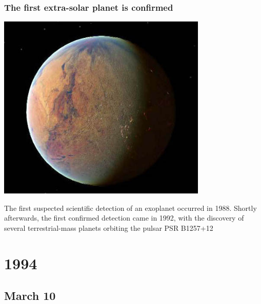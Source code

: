 \documentclass[11pt]{report}
\begin{document}
\subsection{The first extra-solar planet is confirmed}
\vspace{2mm}\begin{center}\includegraphics[width=10cm]{./img/PSR_B1257_12_C.jpg}\end{center}
The first suspected scientific detection of an exoplanet occurred in 1988. Shortly afterwards, the first confirmed detection came in 1992, with the discovery of several terrestrial-mass planets orbiting the pulsar PSR B1257+12

\chapter{1994}
\section{March 10}
\end{document}
